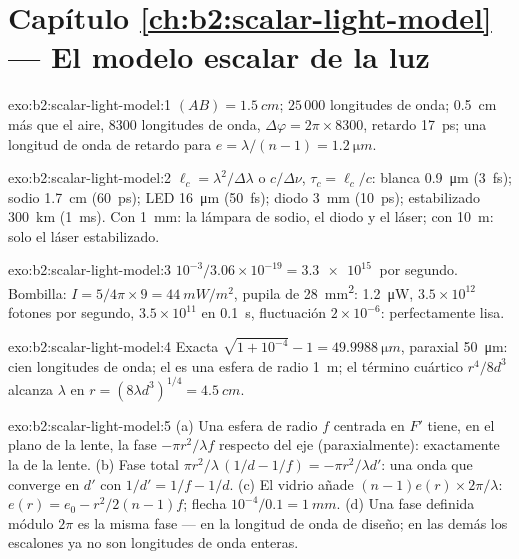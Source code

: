 \section*{Capítulo \ref{ch:b2:scalar-light-model} --- El modelo escalar de la luz}

\begin{solution}{exo:b2:scalar-light-model:1}
$(AB) = \qty{1.5}{cm}$; $25\,000$ longitudes de onda; \qty{0.5}{cm} más que el aire, $8300$
longitudes de onda, $\Delta\varphi = 2\pi \times 8300$, retardo \qty{17}{ps}; una longitud de onda de
retardo para $e = \lambda/(n - 1) = \qty{1.2}{\micro m}$.
\end{solution}

\begin{solution}{exo:b2:scalar-light-model:2}
$\ell_c = \lambda^2/\Delta\lambda$ o $c/\Delta\nu$, $\tau_c = \ell_c/c$: blanca \qty{0.9}{\micro m} (\qty{3}{fs});
sodio \qty{1.7}{cm} (\qty{60}{ps}); LED \qty{16}{\micro m} (\qty{50}{fs}); diodo \qty{3}{mm}
(\qty{10}{ps}); estabilizado \qty{300}{km} (\qty{1}{ms}). Con \qty{1}{mm}: la lámpara de sodio,
el diodo y el láser; con \qty{10}{m}: solo el láser estabilizado.
\end{solution}

\begin{solution}{exo:b2:scalar-light-model:3}
$10^{-3}/3.06 \times 10^{-19} = \qty{3.3e15}{}$ por segundo. Bombilla: $I = 5/4\pi \times 9 =
\qty{44}{mW/m^2}$, pupila de \qty{28}{mm^2}: \qty{1.2}{\micro W}, $3.5 \times 10^{12}$ fotones por segundo,
$3.5 \times 10^{11}$ en \qty{0.1}{s}, fluctuación $2 \times 10^{-6}$: perfectamente lisa.
\end{solution}

\begin{solution}{exo:b2:scalar-light-model:4}
Exacta $\sqrt{1 + 10^{-4}} - 1 = \qty{49.9988}{\micro m}$, paraxial \qty{50}{\micro m}: cien
longitudes de onda; el  es una esfera de radio \qty{1}{m}; el
término cuártico $r^4/8d^3$ alcanza $\lambda$ en $r = (8\lambda d^3)^{1/4} = \qty{4.5}{cm}$.
\end{solution}

\begin{solution}{exo:b2:scalar-light-model:5}
(a) Una esfera de radio $f$ centrada en $F'$ tiene, en el plano de la lente, la
fase $-\pi r^2/\lambda f$ respecto del eje (paraxialmente): exactamente la
de la lente. (b) Fase total $\pi r^2/\lambda\,(1/d - 1/f) = -\pi r^2/\lambda d'$: una onda
que converge en $d'$ con $1/d' = 1/f - 1/d$. (c) El vidrio añade $(n - 1)e(r)
\times2\pi/\lambda$: $e(r) = e_0 - r^2/2(n - 1)f$; flecha $10^{-4}/0.1 = \qty{1}{mm}$. (d) Una
fase definida módulo $2\pi$ es la misma fase --- en la longitud de onda de
diseño; en las demás los escalones ya no son longitudes de onda enteras.
\end{solution}

